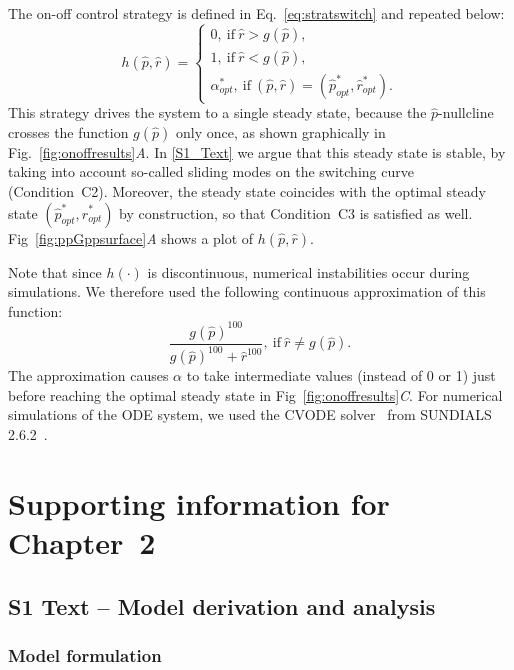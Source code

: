 The on-off control strategy is defined in Eq.~\ref{eq:stratswitch} and repeated below:
\begin{equation}
h(\hat{p}, \hat{r}) = 
\begin{cases}
0, \ \textrm{if} \ \hat{r} > g(\hat{p}),\\
1, \ \textrm{if} \ \hat{r} < g(\hat{p}), \\
\alpha_{opt}^*, \ \textrm{if} \ (\hat{p},\hat{r})=(\hat{p}_{opt}^*,\hat{r}_{opt}^*).
\end{cases}
\end{equation}
This strategy drives the system to a single steady state, because the $\hat{p}$-nullcline crosses the function $g(\hat{p})$ only once, as shown graphically in Fig.~\ref{fig:onoffresults}\textit{A}.
In \ref{S1_Text} we argue that this steady state is stable, by taking into account so-called sliding modes on the switching curve~\cite{filippov_differential_1988} (Condition~C2).
Moreover, the steady state coincides with the optimal steady state $(\hat{p}_{opt}^*,\hat{r}_{opt}^*)$ by construction, so that Condition~C3 is satisfied as well.
Fig~\ref{fig:ppGppsurface}\textit{A} shows a plot of $h(\hat{p}, \hat{r})$.

Note that since $h(\cdot)$ is discontinuous, numerical instabilities occur during simulations.
We therefore used the following continuous approximation of this function:
\begin{equation}
\frac{g(\hat{p})^{100}}{g(\hat{p})^{100} + \hat{r}^{100}}, \ \textrm{if} \ \hat{r} \neq g(\hat{p}).
\end{equation}
The approximation causes $\alpha$ to take intermediate values (instead of 0 or 1) just before reaching the optimal steady state in Fig~\ref{fig:onoffresults}\textit{C}.
For numerical simulations of the ODE system, we used the CVODE solver~\cite{cohen_cvode_1996} from SUNDIALS 2.6.2~\cite{hindmarsh_sundials_2005}.

\clearpage

\section{Supporting information for Chapter~2}

\subsection{S1 Text -- Model derivation and analysis}

\subsubsection{Model formulation}

